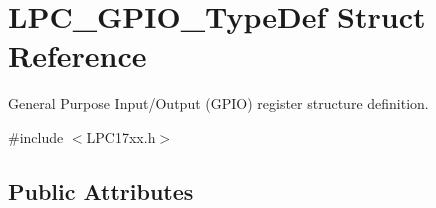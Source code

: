 \hypertarget{struct_l_p_c___g_p_i_o___type_def}{\section{\-L\-P\-C\-\_\-\-G\-P\-I\-O\-\_\-\-Type\-Def \-Struct \-Reference}
\label{struct_l_p_c___g_p_i_o___type_def}
}


\-General \-Purpose \-Input/\-Output (\-G\-P\-I\-O) register structure definition.  




{\ttfamily \#include $<$\-L\-P\-C17xx.\-h$>$}

\subsection*{\-Public \-Attributes}
